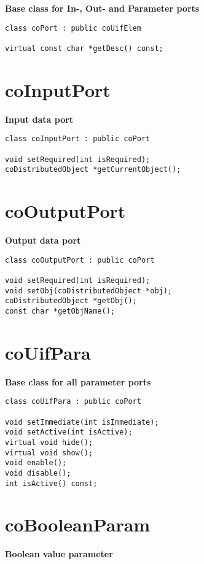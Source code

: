 {\bf Base class for In-, Out- and Parameter ports}

\begin{verbatim}
class coPort : public coUifElem

virtual const char *getDesc() const;
\end{verbatim}

 

\section{coInputPort}

{\bf Input data port}

\begin{verbatim}
class coInputPort : public coPort

void setRequired(int isRequired);
coDistributedObject *getCurrentObject();
\end{verbatim}
 

\section{coOutputPort}

{\bf Output data port}

\begin{verbatim}
class coOutputPort : public coPort
 
void setRequired(int isRequired);
void setObj(coDistributedObject *obj);
coDistributedObject *getObj();
const char *getObjName();
\end{verbatim}


\section{coUifPara} 

{\bf Base class for all parameter ports}

\begin{verbatim}
class coUifPara : public coPort

void setImmediate(int isImmediate);
void setActive(int isActive);
virtual void hide();
virtual void show();
void enable();
void disable();
int isActive() const;
\end{verbatim}

 

\section{coBooleanParam} 

{\bf Boolean value parameter}

